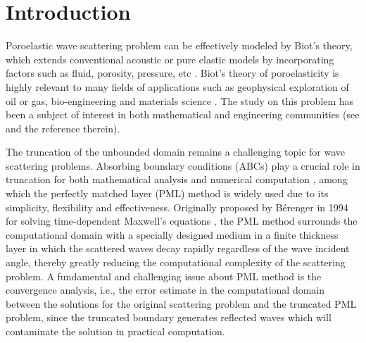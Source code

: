 \documentclass[11pt]{article}
\begin{document}
\section{Introduction}
\setcounter{equation}{0}

Poroelastic wave scattering problem can be effectively modeled by Biot's theory, which extends conventional acoustic
or pure elastic models by incorporating factors such as fluid, porosity, pressure, etc \cite{Biot1956I,Biot1956II}.
Biot's theory of poroelasticity is highly relevant to many fields of applications such as geophysical exploration 
of oil or gas, bio-engineering and materials science \cite{Boer2012,Schanz2003}. The study on this problem has been 
a subject of interest in both mathematical and engineering communities (see \cite{Schanz2009,Yamamoto2004,Zhang2021,
Zhang2025} and the reference therein).

The truncation of the unbounded domain remains a challenging topic for wave scattering problems. Absorbing boundary 
conditions (ABCs) play a crucial role in truncation for both mathematical analysis and numerical computation \cite{HW2013},
among which the perfectly matched layer (PML) method is widely used due to its simplicity, flexibility and effectiveness. 
Originally proposed by Bérenger in 1994 for solving time-dependent Maxwell's equations \cite{Berenger1994}, the PML method 
surrounds the computational domain with a specially designed medium in a finite thickness layer in which the scattered waves 
decay rapidly regardless of the wave incident angle, thereby greatly reducing the computational complexity of the scattering 
problem. A fundamental and challenging issue about PML method is the convergence analysis, i.e., the error estimate in the 
computational domain between the solutions for the original scattering problem and the truncated PML problem, since the 
truncated boundary generates reflected waves which will contaminate the solution in practical computation. 
\end{document}

